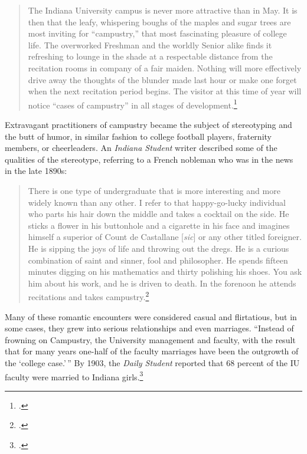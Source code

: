 \documentclass[
  american,
  letterpaper,
]{scrreprt}
\begin{document}
\begin{quote}
The Indiana University campus is never more attractive than in May. It
is then that the leafy, whispering boughs of the maples and sugar trees
are most inviting for ``campustry,'' that most fascinating pleasure of
college life. The overworked Freshman and the worldly Senior alike finds
it refreshing to lounge in the shade at a respectable distance from the
recitation rooms in company of a fair maiden. Nothing will more
effectively drive away the thoughts of the blunder made last hour or
make one forget when the next recitation period begins. The visitor at
this time of year will notice ``cases of campustry'' in all stages of
development.\footnote{.}
\end{quote}

Extravagant practitioners of campustry became the subject of
stereotyping and the butt of humor, in similar fashion to college
football players, fraternity members, or cheerleaders. An \emph{Indiana
Student} writer described some of the qualities of the stereotype,
referring to a French nobleman who was in the news in the late 1890s:

\begin{quote}
There is one type of undergraduate that is more interesting and more
widely known than any other. I refer to that happy-go-lucky individual
who parts his hair down the middle and takes a cocktail on the side. He
sticks a flower in his buttonhole and a cigarette in his face and
imagines himself a superior of Count de Castallane {[}\emph{sic}{]} or
any other titled foreigner. He is sipping the joys of life and throwing
out the dregs. He is a curious combination of saint and sinner, fool and
philosopher. He spends fifteen minutes digging on his mathematics and
thirty polishing his shoes. You ask him about his work, and he is driven
to death. In the forenoon he attends recitations and takes
campustry.\footnote{.}
\end{quote}

Many of these romantic encounters were considered casual and
flirtatious, but in some cases, they grew into serious relationships and
even marriages. ``Instead of frowning on Campustry, the University
management and faculty, with the result that for many years one-half of
the faculty marriages have been the outgrowth of the `college case.'\,''
By 1903, the \emph{Daily Student} reported that 68 percent of the IU
faculty were married to Indiana girls.\footnote{.}
\end{document}

